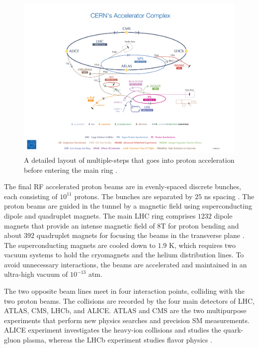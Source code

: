 \begin{figure}
    \centering
    \includegraphics[width=.98\linewidth]{figures/LHC/ProtonAccelerator.jpeg}
    \caption{ A detailed layout of multiple-steps that goes into proton acceleration before entering the main ring \cite{ProtonAcclerator}.\label{fig:ProtonAcc}}
\end{figure}

The final RF accelerated proton beams are in evenly-spaced discrete bunches, each consisting of $10^{11}$ protons. The bunches are separated by $25$ ns spacing \cite{LHCGuide}. The proton beams are guided in the tunnel by a magnetic field using superconducting dipole and quadruplet magnets. The main LHC ring comprises $1232$ dipole magnets that provide an intense magnetic field of $8$T for proton bending and about $392$ quadruplet magnets for focusing the beams in the transverse plane \cite{LHCGuide}. The superconducting magnets are cooled down to $1.9$ K, which requires two vacuum systems to hold the cryomagnets and the helium distribution lines. To avoid unnecessary interactions, the beams are accelerated and maintained in an ultra-high vacuum of $10^{-13}$ atm. 

The two opposite beam lines meet in four interaction points, colliding with the two proton beams. The collisions are recorded by the four main detectors of LHC, ATLAS, CMS, LHCb, and ALICE. ATLAS and CMS are the two multipurpose experiments that perform new physics searches and precision SM measurements. ALICE experiment investigates the heavy-ion collisions and studies the quark-gluon plasma, whereas the LHCb experiment studies flavor physics \cite{LHCGuide}.